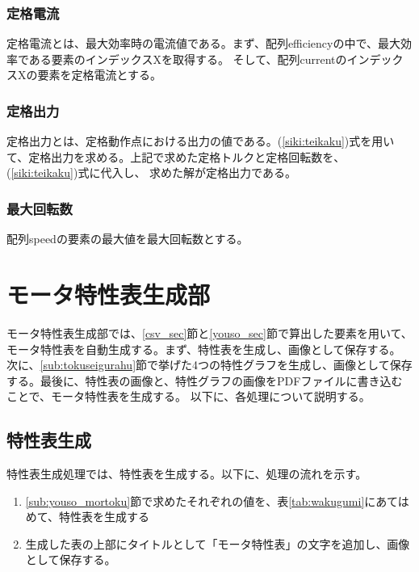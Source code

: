 \subsubsection{定格電流}\label{sub:sub:teikakuden}
定格電流とは、最大効率時の電流値である。まず、配列efficiencyの中で、最大効率である要素のインデックスXを取得する。
そして、配列currentのインデックスXの要素を定格電流とする。

\subsubsection{定格出力}\label{sub:sub:teikakusyutu}
定格出力とは、定格動作点における出力の値である。(\ref{siki:teikaku})式を用いて、定格出力を求める。上記で求めた定格トルクと定格回転数を、(\ref{siki:teikaku})式に代入し、
求めた解が定格出力である。

\subsubsection{最大回転数}\label{sub:sub:saidaikai}
配列speedの要素の最大値を最大回転数とする。

\section{モータ特性表生成部}\label{mortoku_sec}
モータ特性表生成部では、\ref{csv_sec}節と\ref{youso_sec}節で算出した要素を用いて、モータ特性表を自動生成する。まず、特性表を生成し、画像として保存する。
次に、\ref{sub:tokuseigurahu}節で挙げた4つの特性グラフを生成し、画像として保存する。最後に、特性表の画像と、特性グラフの画像をPDFファイルに書き込むことで、モータ特性表を生成する。
以下に、各処理について説明する。

\subsection{特性表生成}\label{sub:mortortoku}

特性表生成処理では、特性表を生成する。以下に、処理の流れを示す。
\begin{enumerate}
    \item \ref{sub:youso_mortoku}節で求めたそれぞれの値を、表\ref{tab:wakugumi}にあてはめて、特性表を生成する
    \item 生成した表の上部にタイトルとして「モータ特性表」の文字を追加し、画像として保存する。
\end{enumerate}

